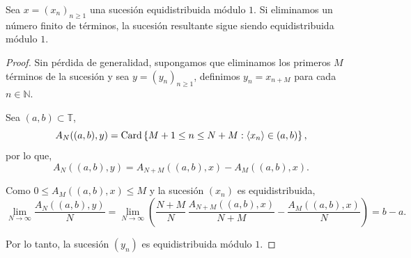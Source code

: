 \begin{proposition}
    \label{prop:quitar_terminos}
    Sea $x=(x_n)_{n\geq1}$ una sucesión equidistribuida módulo $1$.  Si eliminamos
    un número finito de términos, la sucesión resultante sigue siendo equidistribuida módulo $1$.
\end{proposition}

\begin{proof}
    Sin pérdida de generalidad, supongamos que eliminamos los primeros $M$ términos de la sucesión 
    y sea $y=(y_n)_{n\geq1}$, definimos $y_n = x_{n+M}$ para cada $n \in \mathbb{N}$. 
    
    Sea $(a,b) \subset \mathbb{T}$,    
    \[
        A_N((a,b),y) = \operatorname{Card} \left\{M+1 \leq n \leq N+M : \langle x_n \rangle \in (a,b)\right\},
    \]
    por lo que,
    \[
        A_N((a,b),y) = A_{N+M}((a,b),x) - A_M((a,b),x).
    \]

    Como $0 \leq A_M((a,b),x) \leq M$ y la sucesión $(x_n)$ es equidistribuida, 
    \[
        \lim_{N \to \infty} \frac{A_N((a,b),y)}{N} =
        \lim_{N \to \infty}  \left(\frac{N+M}{N} \, \frac{A_{N+M}((a,b),x)}{N+M} - \frac{A_M((a,b),x)}{N} \right) =
        b-a.
    \]

    Por lo tanto, la sucesión $(y_n)$ es equidistribuida módulo $1$.
\end{proof}
